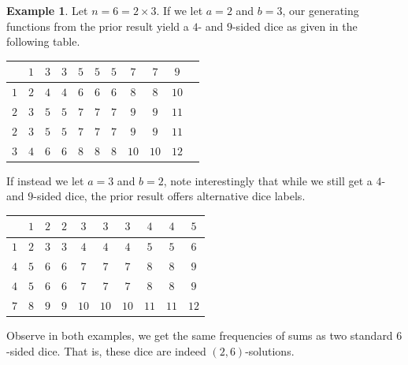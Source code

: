 \documentclass[11pt]{amsart}
\numberwithin{equation}{section}
\theoremstyle{plain}
\theoremstyle{definition}
\newtheorem{example}[equation]{Example}
\begin{document}
\begin{example} 

Let $n=6=2\times 3$. If we let $a=2$ and $b=3$, our generating functions from the prior result yield a $4$- and $9$-sided dice as given in the following table. 


\begin{center}

\begin{tabular}{c|cccccccccc}
  & $1$ & $3$ & $3$ & $5$ & $5$ & $5$ & $7$ & $7 $ & $9$  \\ \hline
$1$ & $2$ & $4$ & $4$ & $6$ & $6$ & $6$ & $8$ & $8$ & $10$ & \\
$2$ & $3$ & $5$ & $5$ & $7$ & $7$ & $7$ & $9$ & $9$ & $11$ \\
$2$ & $3$ & $5$ & $5$ & $7$ & $7$ & $7$ & $9$ & $9$ & $11$ \\
$3$ & $4$ & $6$ & $6$ & $8$ & $8$ & $8$ & $10$ & $10$ & $12$
\end{tabular}
\end{center}

If instead we let $a=3$ and $b=2$, note interestingly that while we still get a $4$- and $9$-sided dice, the prior result offers alternative dice labels.
\begin{center}

\begin{tabular}{c|ccccccccc}
  & $1$ & $2$ & $2$ & $3$ & $3$ & $3$ & $4$ & $4$ & $5$ \\ \hline
  
$1$ & $2$ & $3$ & $3$ & $4$ & $4$ & $4$ & $5$ & $5$ & $6$ \\

$4$ & $5$& $6$ & $6$ & $7$ & $7$ & $7$ & $8$ & $8$ & $9$ \\

$4$ & $5$ & $6$& $6$ & $7$ & $7$& $7$ & $8$& $8$ & $9$\\

$7$ & $8$& $9$& $9$ & $10$ & $10$ & $10$ & $11$ & $11$ & $12$
\end{tabular}

\end{center}

Observe in both examples, we get the same frequencies of sums as two standard $6$-sided dice. That is, these dice are indeed $(2,6)$-solutions.
\end{example}
\end{document}
